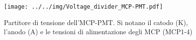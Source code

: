 \begin{figure}[h]\centering\texttt{[image: ../../img/Voltage\_divider\_MCP-PMT.pdf]}\caption{Partitore di tensione dell'MCP-PMT. Si notano il catodo (K), l'anodo (A) e le tensioni di alimentazione degli MCP (MCP1-4)}\label{fig:Voltage_divider_MCP-PMT}\end{figure}
